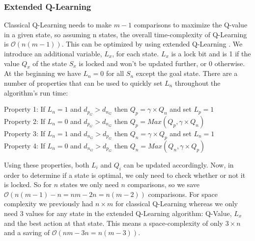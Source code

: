 \subsubsection{Extended Q-Learning}
\label{sec:extended-q-learning}
Classical Q-Learning needs to make $m-1$ comparisons to maximize the Q-value in a given state, so assuming n states, the overall time-complexity of Q-Learning is $\mathcal O(n(m-1))$. This can be optimized by using extended Q-Learning \cite{11}. We introduce an additional variable, $L_x$, for each state. $L_x$ is a lock bit and is 1 if the value $Q_x$ of the state $S_x$ is locked and won't be updated further, or 0 otherwise. At the beginning we have $L_n=0$ for all $S_n$ except the goal state. There are a number of properties that can be used to quickly set $L_n$ throughout the algorithm's run time: 

\vspace{1\baselineskip}\vspace{-\parskip}

\begin{flushleft}
Property 1: If $L_n=1$ and $d_p_G > d_n_G$ then $Q_p = \gamma \times Q_n$ and set $L_p=1$\\
Property 2: If $L_n=0$ and $d_p_G > d_n_G$ then $Q_p = Max(Q_p,\gamma \times Q_n)$\\
Property 3: If $L_n=1$ and $d_n_G > d_p_G$ then $Q_n = \gamma \times Q_p$ and set $L_n=1$\\
Property 4: If $L_n=0$ and $d_n_G > d_p_G$ then $Q_n = Max(Q_n,\gamma \times Q_p)$\\
\end{flushleft}

\vspace{1\baselineskip}\vspace{-\parskip}

Using these properties, both $L_i$ and $Q_i$ can be updated accordingly. Now, in order to determine if a state is optimal, we only need to check whether or not it is locked. So for $n$ states we only need $n$ comparisons, so we save $\mathcal O(n(m-1)-n=nm-2n=n(m-2))$ \cite{11} comparisons.
For space complexity we previously had $n \times m $ for classical Q-Learning whereas we only need $3$ values for any state in the extended Q-Learning algorithm: Q-Value, $L_x$ and the best action at that state. This means a space-complexity of only $3 \times n$ and a saving of $\mathcal O(nm-3n=n(m-3))$.\cite{11}



